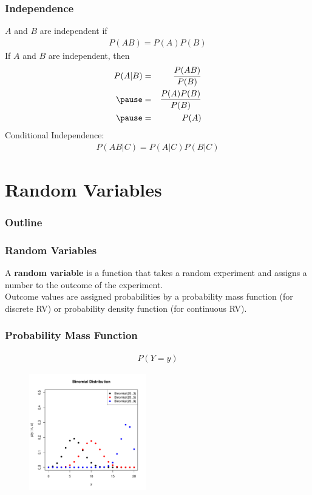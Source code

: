 \documentclass{beamer}
\begin{document}
\begin{frame}
\frametitle{Independence}
$A$ and $B$ are independent if 
\begin{eqnarray*}
P(AB) = P(A) P(B)
\end{eqnarray*}
\pause
If $A$ and $B$ are independent, then
\begin{eqnarray*}
P(A|B) &=& \frac{P(AB)}{P(B)}\\
\pause
&=& \frac{P(A) P(B)}{P(B)} \\
\pause
&=& P(A)
\end{eqnarray*}
\pause
Conditional Independence:
\begin{eqnarray*}
P(AB | C) = P(A|C) P(B|C)
\end{eqnarray*}
\end{frame}

\section{Random Variables}


\begin{frame}
\frametitle{Outline}
\tableofcontents[currentsection]
\end{frame}

\begin{frame}
\frametitle{Random Variables}
\pause
A \textbf{random variable} is a function that takes a random experiment and
assigns a number to the outcome of the experiment. \\
\pause
\bigskip
Outcome values are assigned probabilities by a probability mass
function (for discrete RV) or probability density function (for
continuous RV).
\end{frame}

\begin{frame}
\frametitle{Probability Mass Function}
\pause
\begin{eqnarray*}
P(Y = y)
\end{eqnarray*}
\pause
\begin{figure}[!htp]
\begin{center}
\includegraphics[width=2in, height=2in]{probability-binomial.pdf}
\end{center}
\end{figure}
\end{frame}
\end{document}
